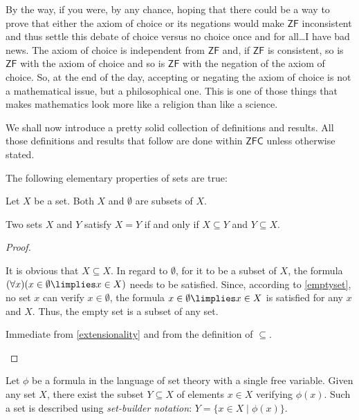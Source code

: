 \begin{para}
By the way, if you were, by any chance, hoping that there could be a way to prove that either the axiom of choice or its negations would make $\mathsf{ZF}$ inconsistent and thus settle this debate of choice versus no choice once and for all\ldots I have bad news. The axiom of choice is independent from $\mathsf{ZF}$ and, if $\mathsf{ZF}$ is consistent, so is $\mathsf{ZF}$ with the axiom of choice and so is $\mathsf{ZF}$ with the negation of the axiom of choice. So, at the end of the day, accepting or negating the axiom of choice is not a mathematical issue, but a philosophical one. This is one of those things that makes mathematics look more like a religion than like a science.

We shall now introduce a pretty solid collection of definitions and results. All those definitions and results that follow are done within $\mathsf{ZFC}$ unless otherwise stated.
\end{para}

\begin{proposition}
\label{setelementary}
The following elementary properties of sets are true:
\begin{statements}
\item Let $X$ be a set. Both $X$ and $\emptyset$ are subsets of $X$.
\item \label{doubleinclussion} Two sets $X$ and $Y$ satisfy $X = Y$ if and only if $X\subseteq Y$ and $Y\subseteq X$.
\end{statements}
\label{<+label+>}
\end{proposition}

\begin{proof}
\begin{parlist}
\item It is obvious that $X\subseteq X$. In regard to $\emptyset$, for it to be a subset of $X$, the formula $(\forall x)(x\in \emptyset \limplies x \in X)$ needs to be satisfied.
Since, according to \ref{emptyset}, no set $x$ can verify $x\in \emptyset$, the formula $x\in \emptyset \limplies x \in X$ is satisfied for any $x$ and $X$. Thus, the empty set is a subset of any set.

\item Immediate from \ref{extensionality} and from the definition of $\subseteq$.
\end{parlist}
\end{proof}


\begin{theorem}
Let $\phi$ be a formula in the language of set theory with a single free variable. Given any set $X$, there exist the subset $Y\subseteq X$ of elements $x\in X$ verifying $\phi(x)$.
Such a set is described using \emph{set-builder notation}: $Y = \{x\in X \mid \phi(x)\}$.
\label{specification}
\end{theorem}

